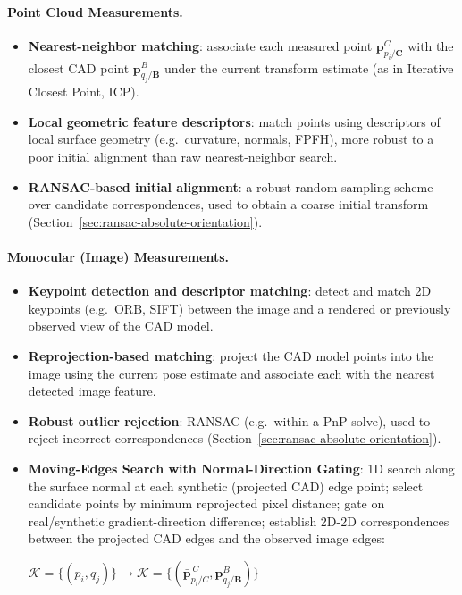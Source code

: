 \documentclass{article}
\newcommand{\vect}[1]{\mathbf{#1}}
\newcommand{\mat}[1]{\mathbf{#1}}
\newcommand{\pBjB}{\vect{p}^{\mathit{B}}_{q_{j}/\mathbf{B}}}
\newcommand{\pCiC}{\vect{p}^{\mathit{C}}_{p_{i}/\mathbf{C}}}
\newcommand{\Kmat}{\mat{K}} %
\newcommand{\corrSet}{\mathcal{K}} %
\begin{document}
\paragraph{Point Cloud Measurements.}
\begin{itemize}
    \item \textbf{Nearest-neighbor matching}: associate each measured point $\pCiC$ with the closest CAD point $\pBjB$ under the current transform estimate (as in Iterative Closest Point, ICP).
    \item \textbf{Local geometric feature descriptors}: match points using descriptors of local surface geometry (e.g.\ curvature, normals, FPFH), more robust to a poor initial alignment than raw nearest-neighbor search.
    \item \textbf{RANSAC-based initial alignment}: a robust random-sampling scheme over candidate correspondences, used to obtain a coarse initial transform (Section~\ref{sec:ransac-absolute-orientation}).
\end{itemize}

\paragraph{Monocular (Image) Measurements.}
\begin{itemize}
    \item \textbf{Keypoint detection and descriptor matching}: detect and match 2D keypoints (e.g.\ ORB, SIFT) between the image and a rendered or previously observed view of the CAD model.
    \item \textbf{Reprojection-based matching}: project the CAD model points into the image using the current pose estimate and associate each with the nearest detected image feature.
    \item \textbf{Robust outlier rejection}: RANSAC (e.g.\ within a PnP solve), used to reject incorrect correspondences (Section~\ref{sec:ransac-absolute-orientation}).
    \item \textbf{Moving-Edges Search with Normal-Direction Gating}: 1D search along the surface normal at each synthetic (projected CAD) edge point; select candidate points by minimum reprojected pixel distance; gate on real/synthetic gradient-direction difference; establish 2D-2D correspondences between the projected CAD edges and the observed image edges:
\begin{center}
\begin{math}
\corrSet = \{ (p_{i},q_{j}) \} \rightarrow \corrSet = \{ (\bar{\vect{p}}^{\,C}_{p_i/C},\pBjB) \}
\end{math}
\end{center}
\end{itemize}
\end{document}
